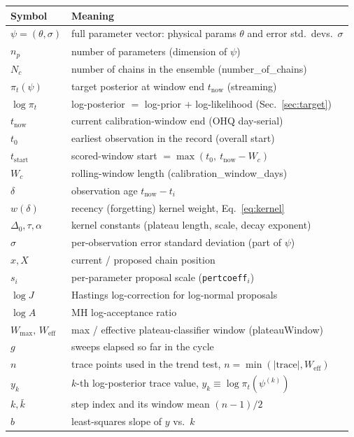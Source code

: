 \documentclass[11pt]{article}
\newcommand{\code}[1]{\texttt{\small #1}}
\newcommand{\param}[1]{\textsf{#1}}
\begin{document}
\begin{center}
\begin{tabular}{@{}ll@{}}
\toprule
Symbol & Meaning\\
\midrule
$\psi=(\theta,\sigma)$ & full parameter vector: physical params $\theta$ and error std.\ devs.\ $\sigma$\\
$n_p$ & number of parameters (dimension of $\psi$)\\
$N_c$ & number of chains in the ensemble (\param{number\_of\_chains})\\
$\pi_t(\psi)$ & target posterior at window end $t_{\text{now}}$ (streaming)\\
$\log\pi_t$ & log-posterior $=$ log-prior $+$ log-likelihood (Sec.~\ref{sec:target})\\
$t_{\text{now}}$ & current calibration-window end (OHQ day-serial)\\
$t_0$ & earliest observation in the record (overall start)\\
$t_{\text{start}}$ & scored-window start $=\max(t_0,\ t_{\text{now}}-W_c)$\\
$W_c$ & rolling-window length (\param{calibration\_window\_days})\\
$\delta$ & observation age $t_{\text{now}}-t_i$\\
$w(\delta)$ & recency (forgetting) kernel weight, Eq.~\eqref{eq:kernel}\\
$\Delta_0,\tau,\alpha$ & kernel constants (plateau length, scale, decay exponent)\\
$\sigma$ & per-observation error standard deviation (part of $\psi$)\\
$x,X$ & current / proposed chain position\\
$s_i$ & per-parameter proposal scale (\code{pertcoeff}$_i$)\\
$\log J$ & Hastings log-correction for log-normal proposals\\
$\log A$ & MH log-acceptance ratio\\
$W_{\max},\,W_{\text{eff}}$ & max / effective plateau-classifier window (\param{plateauWindow})\\
$g$ & sweeps elapsed so far in the cycle\\
$n$ & trace points used in the trend test, $n=\min(|\text{trace}|,W_{\text{eff}})$\\
$y_k$ & $k$-th log-posterior trace value, $y_k\equiv\log\pi_t(\psi^{(k)})$\\
$k,\bar k$ & step index and its window mean $(n-1)/2$\\
$b$ & least-squares slope of $y$ vs.\ $k$\\

\end{tabular}
\end{center}
\end{document}
